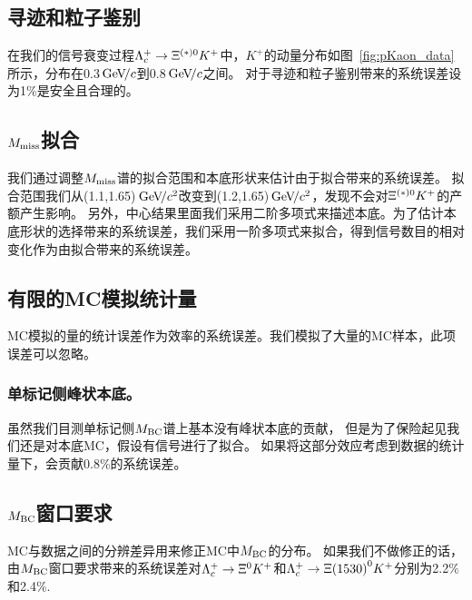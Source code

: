 \subsection{寻迹和粒子鉴别}
在我们的信号衰变过程$\Lambda_{c}^{+}\rightarrow \Xi^{(*)0}K^{+}$中，$K^{+}$的动量分布如图~\ref{fig:pKaon_data}所示，分布在0.3${\mathrm{\,Ge\kern -0.1em V\!/}c}$到0.8${\mathrm{\,Ge\kern -0.1em V\!/}c}$之间。
对于寻迹和粒子鉴别带来的系统误差设为1\%是安全且合理的。

\begin{figure*}[hp]
\centering
{}
\hspace{1pt}
\hspace{1pt}
\hspace{1pt}
\caption{\textbf{数据}[Fig.(a) 和 (b)]中和 \textbf{Cocktail MC}[Fig.(c) 和 (d)]中$K^{+}$介子的动量分布。}
\label{fig:pKaon_data}
\end{figure*}

\subsection{$M_{\rm miss}$拟合}

我们通过调整$M_{\rm miss}$谱的拟合范围和本底形状来估计由于拟合带来的系统误差。
拟合范围我们从(1.1,1.65)${\mathrm{\,Ge\kern -0.1em V\!/}c^2}$改变到(1.2,1.65)${\mathrm{\,Ge\kern -0.1em V\!/}c^2}$，发现不会对$\Xi^{(*)0}K^{+}$的产额产生影响。
另外，中心结果里面我们采用二阶多项式来描述本底。为了估计本底形状的选择带来的系统误差，我们采用一阶多项式来拟合，得到信号数目的相对变化作为由拟合带来的系统误差。


\subsection{有限的MC模拟统计量}
MC模拟的量的统计误差作为效率的系统误差。我们模拟了大量的MC样本，此项误差可以忽略。

\subsubsection{单标记侧峰状本底。}
虽然我们目测单标记侧$M_{\rm BC}$谱上基本没有峰状本底的贡献，
但是为了保险起见我们还是对本底MC，假设有信号进行了拟合。
如果将这部分效应考虑到数据的统计量下，会贡献0.8\%的系统误差。

\subsection{$M_{\rm BC}$窗口要求} 
MC与数据之间的分辨差异用来修正MC中$M_{\rm BC}$的分布。
如果我们不做修正的话，由$M_{\rm BC}$窗口要求带来的系统误差对$\Lambda_{c}^{+}\rightarrow \Xi^{0}K^{+}$和$\Lambda_{c}^{+}\rightarrow \Xi{(1530)}^{0}K^{+}$分别为2.2$\%$和2.4$\%$.

